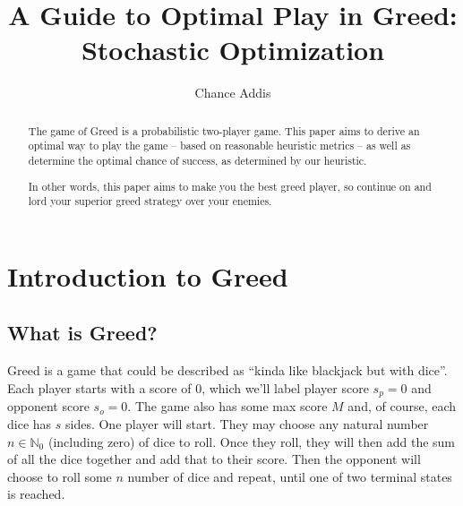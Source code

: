\documentclass[a4paper]{article}
\title{A Guide to Optimal Play in Greed: Stochastic Optimization}
\author{Chance Addis}
\affil{Department of Mathematics and Statistics, Reed College}
\begin{document}
\maketitle

\begin{abstract}
The game of Greed is a probabilistic two-player game. This paper aims to derive an optimal way to play the game -- based on reasonable heuristic metrics -- as well as determine the optimal chance of success, as determined by our heuristic. 

In other words, this paper aims to make you the best greed player, so continue on and lord your superior greed strategy over your enemies. 
\end{abstract}




\section{Introduction to Greed}


\subsection{What is Greed?}

Greed is a game that could be described as ``kinda like blackjack but with dice''. Each player starts with a score of 0, which we'll label player score $s_p = 0$ and opponent score $s_o = 0$. The game also has some max score $M$ and, of course, each dice has $s$ sides. One player will start. They may choose any natural number $n \in \mathbb{N}_0$ (including zero) of dice to roll. Once they roll, they will then add the sum of all the dice together and add that to their score. Then the opponent will choose to roll some $n$ number of dice and repeat, until one of two terminal states is reached.
\end{document}
